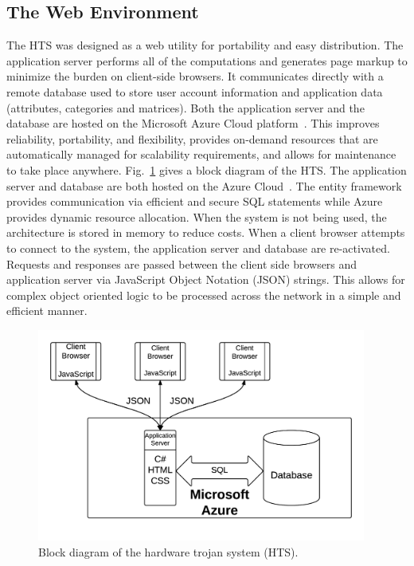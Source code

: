 \subsection{The Web Environment} \label{sec:webEnvironment}
The HTS was designed as a web utility for portability and easy distribution.
The application server performs all of the computations and generates page markup to minimize the burden on client-side browsers.
It communicates directly with a remote database used to store user account information and application data (attributes, categories and matrices).
Both the application server and the database are hosted on the Microsoft Azure Cloud platform~\cite{Azure}.
This improves reliability, portability, and flexibility, provides on-demand resources that are automatically managed for scalability requirements,
and allows for maintenance to take place anywhere.
Fig.~\ref{fig:TrojanDistribution} gives a block diagram of the HTS.
The application server and database are both hosted on the Azure Cloud~\cite{Azure}.
The entity framework provides communication via efficient and secure SQL statements while
Azure provides dynamic resource allocation.
When the system is not being used, the architecture is stored in memory to reduce costs.
When a client browser attempts to connect to the system, the application server and database are re-activated.
Requests and responses are passed between the client side browsers and application server via JavaScript Object Notation (JSON) strings.
This allows for complex object oriented logic to be processed across the network in a simple and efficient manner.
\begin{figure}[h]
	\centering
	\includegraphics[height = 7cm]{figures/Distribution}
	\caption{Block diagram of the hardware trojan system (HTS).}
	\label{fig:TrojanDistribution}
\end{figure}

